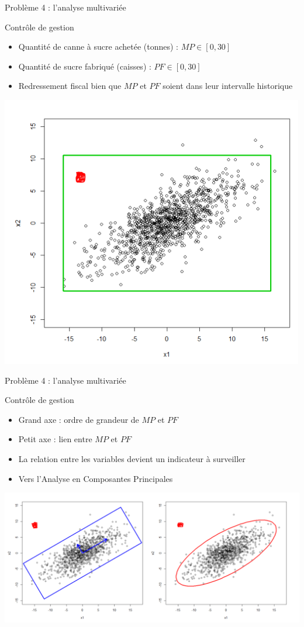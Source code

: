 \documentclass[10pt]{beamer}
\begin{document}

\begin{frame}{Problème 4 : l'analyse multivariée} 
 
\begin{block}{Contrôle de gestion}
\small {\begin{itemize}
\item Quantité de canne à sucre achetée (tonnes) : $MP \in [0,  30]$ 
\item Quantité de sucre fabriqué (caisses) : $PF \in [0,  30]$
\item Redressement fiscal bien que $MP$ et $PF$ soient dans leur intervalle historique
\end{itemize}}
\end{block} \pause
\begin{center}
\includegraphics[height=0.4\textwidth]{figures/acp0.png}
\end{center} 
 
\end{frame}

\begin{frame}{Problème 4 : l'analyse multivariée} 
 
\begin{block}{Contrôle de gestion}
\small {\begin{itemize}
\item Grand axe : ordre de grandeur de $MP$ et $PF$
\item Petit axe : lien entre $MP$ et $PF$
\item La relation entre les variables devient un indicateur à surveiller
\item Vers l'Analyse en Composantes Principales  
\end{itemize}}
\end{block}  

\begin{center}
\includegraphics[height=0.4\textwidth]{figures/acp2.png}
\end{center} 
\end{frame}
\end{document}
